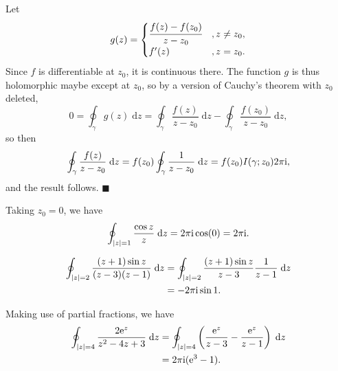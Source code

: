 \documentclass[letter-paper]{tufte-book}
\newenvironment{proof}[1][Proof]{\begin{trivlist}
\item[\hskip \labelsep {\bfseries #1}]}{\end{trivlist}}
\newenvironment{example}[1][Example]{\begin{trivlist}
\item[\hskip \labelsep {\bfseries #1}]}{\end{trivlist}}
\newcommand{\ex}{\mathrm{e}}
\newcommand{\zi}{{\rm i}}
\newcommand{\qed}{\hfill$\blacksquare$}
\begin{document}
\begin{proof}
  Let
  \begin{equation*}
    g(z) = \begin{cases} \cfrac{f(z) - f(z_0)}{z - z_0}&, z \neq z_0,\\
      f'(z)&, z = z_0.\end{cases}
  \end{equation*}
  Since $f$ is differentiable at $z_0$, it is continuous there. The function $g$
  is thus holomorphic maybe except at $z_0$, so by a version of Cauchy's theorem
  with $z_0$ deleted,
  \begin{equation*}
    0 = \oint_\gamma g(z)\; \mathrm{d}z = \oint_\gamma \frac{f(z)}{z - z_0}\; \mathrm{d}z - \oint_\gamma \frac{f(z_0)}{z - z_0}\; \mathrm{d}z,
  \end{equation*}
  so then
  \begin{equation*}
    \oint_\gamma \frac{f(z)}{z - z_0}\; \mathrm{d}z = f(z_0) \oint_\gamma \frac{1}{z - z_0}\; \mathrm{d}z = f(z_0) I(\gamma; z_0) 2\pi\zi,
  \end{equation*}
  and the result follows. \qed
\end{proof}

\begin{example}
  Taking $z_0 = 0$, we have
  \begin{equation*}
    \oint_{|z| = 1} \frac{\cos z}{z}\; \mathrm{d}z = 2\pi\zi \cos(0) = 2\pi\zi.
  \end{equation*}
\end{example}

\begin{example}
  \begin{align*}
    \oint_{|z| = 2} \frac{(z+1) \sin z}{(z-3)(z-1)}\; \mathrm{d}z &= \oint_{|z| = 2} \frac{(z+1) \sin z}{z-3}\frac{1}{z-1}\; \mathrm{d}z \\
      &= -2\pi\zi \sin 1.
  \end{align*}
\end{example}

\begin{example}
  Making use of partial fractions, we have
  \begin{align*}
    \oint_{|z| = 4} \frac{2\ex^z}{z^2 - 4z + 3}\; \mathrm{d}z &= \oint_{|z| = 4} \left(\frac{\ex^z}{z - 3} - \frac{\ex^z}{z - 1}\right)\; \mathrm{d}z \\
      &= 2\pi\zi (\ex^3 - 1).
  \end{align*}
\end{example}
\end{document}
